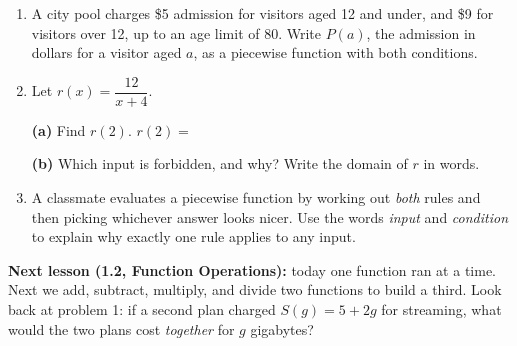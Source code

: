 \documentclass[10pt]{article}
\begin{document}
\begin{enumerate}[leftmargin=1.9em, itemsep=10pt, start=8]

\item A city pool charges \$5 admission for visitors aged 12 and under, and \$9 for visitors
      over 12, up to an age limit of 80. Write $P(a)$, the admission in dollars for a visitor
      aged $a$, as a piecewise function with both conditions.

\item Let $r(x) = \dfrac{12}{x + 4}$.

      \textbf{(a)} Find $r(2)$. \quad $r(2) = $ 

      \textbf{(b)} Which input is forbidden, and why? Write the domain of $r$ in words.

\item A classmate evaluates a piecewise function by working out \emph{both} rules and then
      picking whichever answer looks nicer. Use the words \emph{input} and \emph{condition} to
      explain why exactly one rule applies to any input.

\end{enumerate}

\vspace{0.1in}

\boxguard[8]
\begin{spiralbox}
\small
\textbf{Next lesson (1.2, Function Operations):} today one function ran at a time. Next we add,
subtract, multiply, and divide two functions to build a third. Look back at problem 1: if a
second plan charged $S(g) = 5 + 2g$ for streaming, what would the two plans cost \emph{together}
for $g$ gigabytes?
\end{spiralbox}
\end{document}
